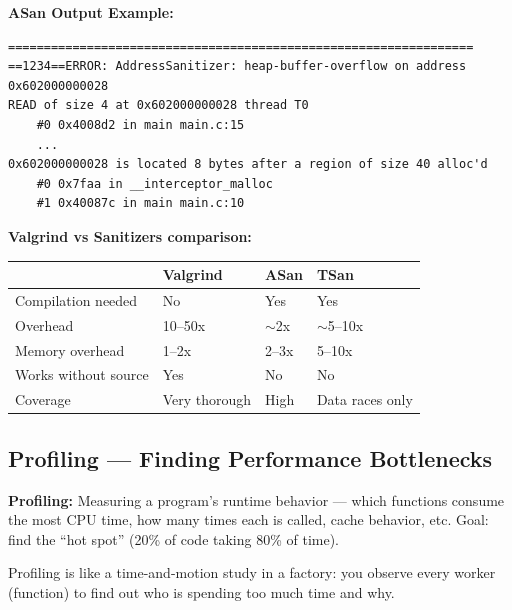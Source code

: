 \documentclass[11pt,a4paper]{article}
\begin{document}
\textbf{ASan Output Example:}
\begin{lstlisting}[style=bashstyle]
=================================================================
==1234==ERROR: AddressSanitizer: heap-buffer-overflow on address 0x602000000028
READ of size 4 at 0x602000000028 thread T0
    #0 0x4008d2 in main main.c:15
    ...
0x602000000028 is located 8 bytes after a region of size 40 alloc'd
    #0 0x7faa in __interceptor_malloc
    #1 0x40087c in main main.c:10
\end{lstlisting}

\begin{keypoint}
\textbf{Valgrind vs Sanitizers comparison:}
\begin{center}
\begin{tabular}{L{4cm} C{3cm} C{3cm} C{3cm}}
\toprule
& \textbf{Valgrind} & \textbf{ASan} & \textbf{TSan} \\
\midrule
Compilation needed & No & Yes & Yes \\
Overhead & 10--50x & $\sim$2x & $\sim$5--10x \\
Memory overhead & 1--2x & 2--3x & 5--10x \\
Works without source & Yes & No & No \\
Coverage & Very thorough & High & Data races only \\
\bottomrule
\end{tabular}
\end{center}
\end{keypoint}

\subsection{Profiling --- Finding Performance Bottlenecks}

\begin{mydef}
\textbf{Profiling:} Measuring a program's runtime behavior --- which functions consume the most CPU time, how many times each is called, cache behavior, etc. Goal: find the ``hot spot'' (20\% of code taking 80\% of time).
\end{mydef}

\begin{analogy}
Profiling is like a time-and-motion study in a factory: you observe every worker (function) to find out who is spending too much time and why.
\end{analogy}
\end{document}
